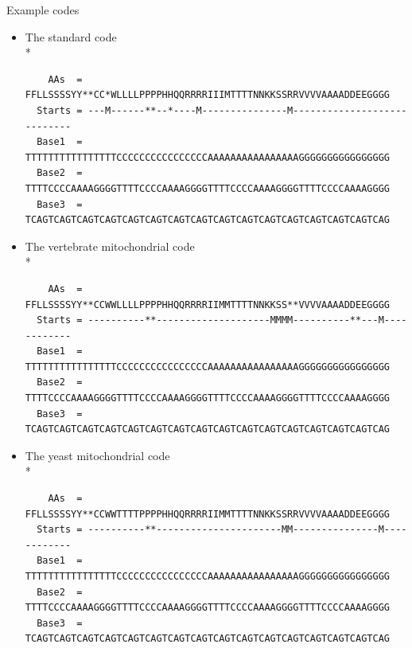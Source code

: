 \documentclass[pdf]{beamer}
\begin{document}
\begin{frame}[fragile]{Example codes}
  \begin{itemize}
  \item The standard code\\*
    \tiny
\begin{verbatim}
    AAs  = FFLLSSSSYY**CC*WLLLLPPPPHHQQRRRRIIIMTTTTNNKKSSRRVVVVAAAADDEEGGGG
  Starts = ---M------**--*----M---------------M----------------------------
  Base1  = TTTTTTTTTTTTTTTTCCCCCCCCCCCCCCCCAAAAAAAAAAAAAAAAGGGGGGGGGGGGGGGG
  Base2  = TTTTCCCCAAAAGGGGTTTTCCCCAAAAGGGGTTTTCCCCAAAAGGGGTTTTCCCCAAAAGGGG
  Base3  = TCAGTCAGTCAGTCAGTCAGTCAGTCAGTCAGTCAGTCAGTCAGTCAGTCAGTCAGTCAGTCAG
\end{verbatim}
\normalsize
\item The vertebrate mitochondrial code\\*
  \tiny
\begin{verbatim}
    AAs  = FFLLSSSSYY**CCWWLLLLPPPPHHQQRRRRIIMMTTTTNNKKSS**VVVVAAAADDEEGGGG
  Starts = ----------**--------------------MMMM----------**---M------------
  Base1  = TTTTTTTTTTTTTTTTCCCCCCCCCCCCCCCCAAAAAAAAAAAAAAAAGGGGGGGGGGGGGGGG
  Base2  = TTTTCCCCAAAAGGGGTTTTCCCCAAAAGGGGTTTTCCCCAAAAGGGGTTTTCCCCAAAAGGGG
  Base3  = TCAGTCAGTCAGTCAGTCAGTCAGTCAGTCAGTCAGTCAGTCAGTCAGTCAGTCAGTCAGTCAG
\end{verbatim}

\normalsize
\item The yeast mitochondrial code\\*
  \tiny
\begin{verbatim}
    AAs  = FFLLSSSSYY**CCWWTTTTPPPPHHQQRRRRIIMMTTTTNNKKSSRRVVVVAAAADDEEGGGG
  Starts = ----------**----------------------MM---------------M------------
  Base1  = TTTTTTTTTTTTTTTTCCCCCCCCCCCCCCCCAAAAAAAAAAAAAAAAGGGGGGGGGGGGGGGG
  Base2  = TTTTCCCCAAAAGGGGTTTTCCCCAAAAGGGGTTTTCCCCAAAAGGGGTTTTCCCCAAAAGGGG
  Base3  = TCAGTCAGTCAGTCAGTCAGTCAGTCAGTCAGTCAGTCAGTCAGTCAGTCAGTCAGTCAGTCAG
\end{verbatim}
  \end{itemize}

\end{frame}
\end{document}
